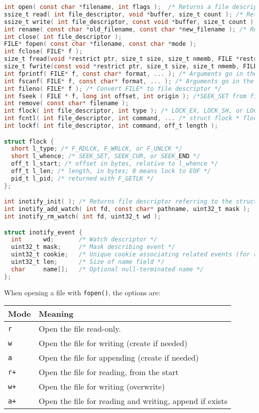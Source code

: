 \documentclass[legalpaper,10pt]{article}
\begin{document}
\begin{lstlisting}[language=C]
int open( const char *filename, int flags );  /* Returns a file descriptor if successful, -1 on error */
ssize_t read( int file_descriptor, void *buffer, size_t count ); /* Returns number of bytes read */
ssize_t write( int file_descriptor, const void *buffer, size_t count ); /* Returns number of bytes written */
int rename( const char *old_filename, const char *new_filename ); /* Returns 0 on success */
int close( int file_descriptor ); 
FILE* fopen( const char *filename, const char *mode );
int fclose( FILE* f );
size_t fread(void *restrict ptr, size_t size, size_t nmemb, FILE *restrict stream);
size_t fwrite(const void *restrict ptr, size_t size, size_t nmemb, FILE *restrict stream);
int fprintf( FILE* f, const char* format, ... ); /* Arguments go in the ...  */
int fscanf( FILE* f, const char* format, ... ); /* Arguments go in the ...  */
int fileno( FILE* f ); /* Convert FILE* to file descriptor */
int fseek ( FILE * f, long int offset, int origin ); /*SEEK_SET from file start. SEEK_CUR from current loc.*/
int remove( const char* filename );
int flock( int file_descriptor, int type ); /* LOCK_EX, LOCK_SH, or LOCK_UN for type */
int fcntl( int file_descriptor, int command, ... /* struct flock * flockptr */ );
int lockf( int file_descriptor, int command, off_t length );

struct flock {
  short l_type; /* F_RDLCK, F_WRLCK, or F_UNLCK */
  short l_whence; /* SEEK_SET, SEEK_CUR, or SEEK_END */
  off_t l_start; /* offset in bytes, relative to l_whence */ 
  off_t l_len; /* length, in bytes; 0 means lock to EOF */ 
  pid_t l_pid; /* returned with F_GETLK */
};

int inotify_init( ); /* Returns file descriptor referring to the struct */ 
int inotify_add_watch( int fd, const char* pathname, uint32_t mask );
int inotify_rm_watch( int fd, uint32_t wd );

struct inotify_event {
  int      wd;       /* Watch descriptor */
  uint32_t mask;     /* Mask describing event */
  uint32_t cookie;   /* Unique cookie associating related events (for rename(2)) */  
  uint32_t len;      /* Size of name field */
  char     name[];   /* Optional null-terminated name */
};

\end{lstlisting}

When opening a file with \texttt{fopen()}, the options are:\\
\begin{tabular}{l|l}
	\textbf{Mode} & \textbf{Meaning} \\ \hline
	\texttt{r} & Open the file read-only. \\ \hline
	\texttt{w} & Open the file for writing (create if needed) \\ \hline
	\texttt{a} & Open the file for appending (create if needed) \\ \hline
	\texttt{r+} & Open the file for reading, from the start \\ \hline
	\texttt{w+} & Open the file for writing (overwrite) \\ \hline
	\texttt{a+} & Open the file for reading and writing, append if exists \\
\end{tabular}
\end{document}
